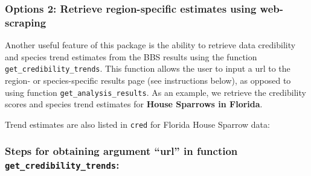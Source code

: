 \documentclass[12pt,twoside,openany]{reedthesis}
\newenvironment{Shaded}{\begin{snugshade}}{\end{snugshade}}
\newcommand{\CommentTok}[1]{\textcolor[rgb]{0.56,0.35,0.01}{\textit{#1}}}
\newcommand{\KeywordTok}[1]{\textcolor[rgb]{0.13,0.29,0.53}{\textbf{#1}}}
\newcommand{\NormalTok}[1]{#1}
\newcommand{\OperatorTok}[1]{\textcolor[rgb]{0.81,0.36,0.00}{\textbf{#1}}}
\newcommand{\StringTok}[1]{\textcolor[rgb]{0.31,0.60,0.02}{#1}}
\begin{document}
\hypertarget{options-2-retrieve-region-specific-estimates-using-web-scraping}{%
\subsubsection{Options 2: Retrieve region-specific estimates using web-scraping}\label{options-2-retrieve-region-specific-estimates-using-web-scraping}}

Another useful feature of this package is the ability to retrieve data credibility and species trend estimates from the BBS results using the function \texttt{get\_credibility\_trends}. This function allows the user to input a url to the region- or species-specific results page (see instructions below), as opposed to using function \texttt{get\_analysis\_results}. As an example, we retrieve the credibility scores and species trend estimates for \textbf{House Sparrows in Florida}.
\begin{Shaded}
\end{Shaded}
Trend estimates are also listed in \texttt{cred} for Florida House Sparrow data:
\begin{Shaded}
\end{Shaded}
\hypertarget{steps-for-obtaining-argument-url-in-function-get_credibility_trends}{%
\subsubsection{\texorpdfstring{Steps for obtaining argument ``url'' in function \texttt{get\_credibility\_trends}:}{Steps for obtaining argument ``url'' in function get\_credibility\_trends:}}\label{steps-for-obtaining-argument-url-in-function-get_credibility_trends}}
\end{document}
